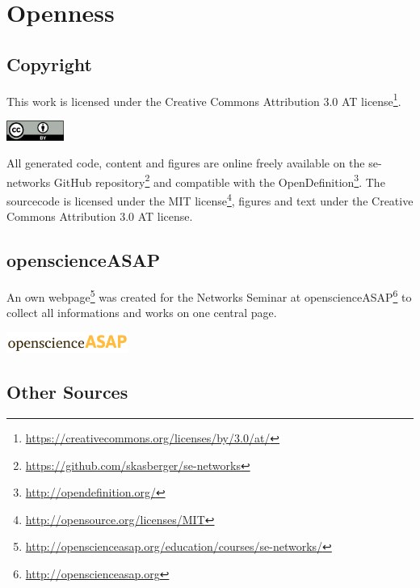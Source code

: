 \documentclass[
a4paper,     %
12pt         %
]{scrartcl}  %
\begin{document}
\section{Openness}
\label{sec:openness}

\subsection{Copyright}
\label{sub:copyright}

This work is licensed under the Creative Commons Attribution 3.0 AT license\footnote{\url{https://creativecommons.org/licenses/by/3.0/at/}}.

\begin{flushleft}
  \includegraphics[width=0.14\textwidth]{./images/cc-by.png}
\end{flushleft}

All generated code, content and figures are online freely available on the se-networks GitHub repository\footnote{\url{https://github.com/skasberger/se-networks}} and compatible with the OpenDefinition\footnote{\url{http://opendefinition.org/}}. The sourcecode is licensed under the MIT license\footnote{\url{http://opensource.org/licenses/MIT}}, figures and text under the Creative Commons Attribution 3.0 AT license.\\

\subsection{openscienceASAP}
\label{sub:openscienceASAP}

An own webpage\footnote{\url{http://openscienceasap.org/education/courses/se-networks/}} was created for the Networks Seminar at openscienceASAP\footnote{\url{http://openscienceasap.org}} to collect all informations and works on one central page.
\begin{flushleft}
  \includegraphics[width=0.3\textwidth]{./images/openscienceASAP-logo.png}
\end{flushleft}

\subsection{Other Sources}
\label{sub:foreign-data-sources}
\end{document}
